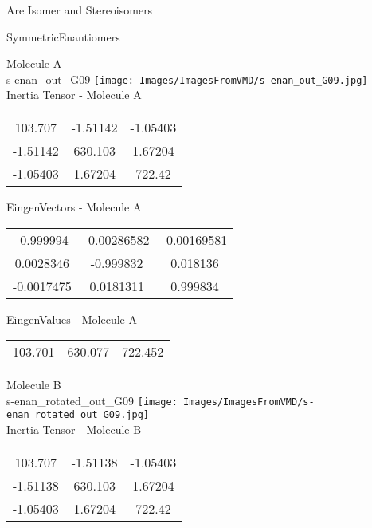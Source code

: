 \begin{center}
\vtab
\vtab
\textcolor{NavyBlue}{\Large Are Isomer and Stereoisomers}
\end{center}
\newpage

\vtab[-2cm]
\begin{center}
{\large SymmetricEnantiomers}
\end{center}
\begin{multicols}{2}
\begin{center}
Molecule A \\ 
s-enan\_out\_G09
\texttt{[image: Images/ImagesFromVMD/s-enan\_out\_G09.jpg]}
\\
Inertia Tensor - Molecule A \\
\vtab
\begin{tabular}{|c c c|}
103.707	 & 	-1.51142	 & 	-1.05403	 \\
-1.51142	 & 	630.103	 & 	1.67204	 \\
-1.05403	 & 	1.67204	 & 	722.42
\end{tabular}

\vtab
 EingenVectors - Molecule A     \\
\vtab
\begin{tabular}{|c c c|}
-0.999994	 & 	-0.00286582	 & 	-0.00169581	 \\
0.0028346	 & 	-0.999832	 & 	0.018136	 \\
-0.0017475	 & 	0.0181311	 & 	0.999834
\end{tabular}

\vtab
 EingenValues - Molecule A     \\
\vtab
\begin{tabular}{|c c c|}
103.701	 & 	630.077	 & 	722.452
\end{tabular}
\columnbreak

Molecule B \\ 
s-enan\_rotated\_out\_G09
\texttt{[image: Images/ImagesFromVMD/s-enan\_rotated\_out\_G09.jpg]}
\\
Inertia Tensor - Molecule B \\
\vtab
\begin{tabular}{|c c c|}
103.707	 & 	-1.51138	 & 	-1.05403	 \\
-1.51138	 & 	630.103	 & 	1.67204	 \\
-1.05403	 & 	1.67204	 & 	722.42
\end{tabular}


\end{center}
\end{multicols}
